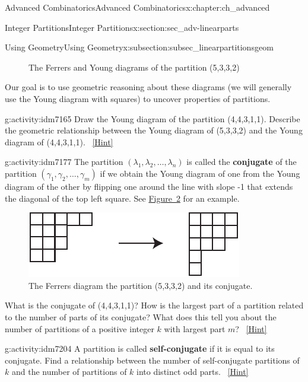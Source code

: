 \documentclass[oneside,10pt,]{book}
\newcommand{\terminology}[1]{\textbf{#1}}
\numberwithin{equation}{chapter}
\begin{document}
\begin{chapterptx}{Advanced Combinatorics}{}{Advanced Combinatorics}{}{}{x:chapter:ch_advanced}
\begin{sectionptx}{Integer Partitions}{}{Integer Partitions}{}{}{x:section:sec_adv-linearparts}
\begin{subsectionptx}{Using Geometry}{}{Using Geometry}{}{}{x:subsection:subsec_linearpartitionsgeom}
\begin{introduction}{}
\begin{figure}
\caption{The Ferrers and Young diagrams of the partition (5,3,3,2)\label{x:figure:FerrersYoung-repeat}}
\end{figure}
Our goal is to use geometric reasoning about these diagrams (we will generally use the Young diagram with squares) to uncover properties of partitions.%
\begin{activity}{}{g:activity:idm7165}%
Draw the Young diagram of the partition (4,4,3,1,1). Describe the geometric relationship between the Young diagram of (5,3,3,2) and the Young diagram of (4,4,3,1,1).%
\qquad~\hfill{\tiny\hyperlink{g:hint:idm7168-back}{[Hint]}}\end{activity}
\begin{activity}{}{g:activity:idm7177}%
The partition \((\lambda_1,\lambda_2,\ldots, \lambda_n)\) is called the \terminology{conjugate} of the partition \((\gamma_1,\gamma_2,\ldots, \gamma_m)\) if we obtain the Young diagram of one from the Young diagram of the other by flipping one around the line with slope -1 that extends the diagonal of the top left square. See \hyperref[x:figure:conjugateYoung]{Figure~\ref{x:figure:conjugateYoung}} for an example.%
\begin{figure}
\centering
\includegraphics[width=0.5\linewidth]{images/conjugateYoung}
\caption{The Ferrers diagram the partition (5,3,3,2) and its conjugate.\label{x:figure:conjugateYoung}}
\end{figure}
What is the conjugate of (4,4,3,1,1)? How is the largest part of a partition related to the number of parts of its conjugate? What does this tell you about the number of partitions of a positive integer \(k\) with largest part \(m\)?%
\qquad~\hfill{\tiny\hyperlink{g:hint:idm7195-back}{[Hint]}}\end{activity}
\begin{activity}{}{g:activity:idm7204}%
A partition is called \terminology{self-conjugate} if it is equal to its conjugate. Find a relationship between the number of self-conjugate partitions of \(k\) and the number of partitions of \(k\) into distinct odd parts.%
\qquad~\hfill{\tiny\hyperlink{g:hint:idm7215-back}{[Hint]}}\end{activity}

\end{introduction}
\end{subsectionptx}
\end{sectionptx}
\end{chapterptx}
\end{document}
